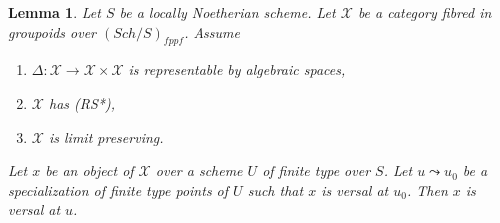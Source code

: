 \documentclass{stacks-project}
\theoremstyle{plain}
\newtheorem{lemma}[subsection]{Lemma}
\theoremstyle{definition}
\theoremstyle{remark}
\numberwithin{equation}{subsection}
\def\Sch{\mathit{Sch}}
\begin{document}
\begin{lemma}
\label{lemma-generalization-versality}
Let $S$ be a locally Noetherian scheme. Let $\mathcal{X}$ be a category fibred
in groupoids over $(\Sch/S)_{fppf}$. Assume
\begin{enumerate}
\item $\Delta : \mathcal{X} \to \mathcal{X} \times \mathcal{X}$ is
representable by algebraic spaces,
\item $\mathcal{X}$ has (RS*),
\item $\mathcal{X}$ is limit preserving.
\end{enumerate}
Let $x$ be an object of $\mathcal{X}$ over a scheme $U$ of finite type over
$S$. Let $u \leadsto u_0$ be a specialization of finite type points of $U$
such that $x$ is versal at $u_0$. Then $x$ is versal at $u$.
\end{lemma}
\end{document}
